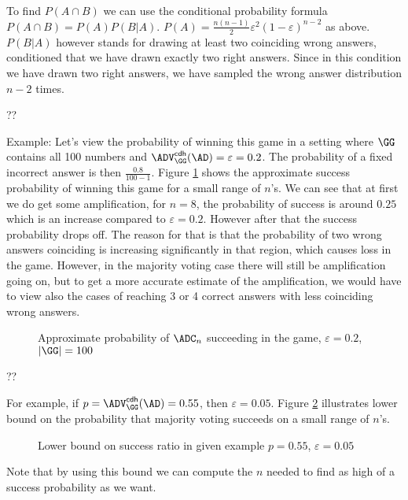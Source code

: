 \documentclass{crypto-exercise}
\begin{document}
\begin{solution}
\begin{center}
\end{center}

To find $P(A \cap B)$ we can use the conditional probability formula $P(A \cap B) = P(A)P(B|A)$. $P(A) = \frac{n(n-1)}{2} \varepsilon^2 (1-\varepsilon)^{n-2}$ as above. $P(B|A)$ however stands for drawing at least two coinciding wrong answers, conditioned that we have drawn exactly two right answers. Since in this condition we have drawn two right answers, we have sampled the wrong answer distribution $n-2$ times. 

??


Example: Let's view the probability of winning this game in a setting where $\GG$ contains all 100 numbers and $\ADVCDH{\GG}{\AD} = \varepsilon = 0.2$. The probability of a fixed incorrect answer is then $\frac{0.8}{100-1}$. Figure \ref{approx} shows the approximate success probability of winning this game for a small range of $n$'s. We can see that at first we do get some amplification, for $n=8$, the probability of success is around $0.25$ which is an increase compared to $\varepsilon = 0.2$. However after that the success probability drops off. The reason for that is that the probability of two wrong answers coinciding is increasing significantly in that region, which causes loss in the game. However, in the majority voting case there will still be amplification going on, but to get a more accurate estimate of the amplification, we would have to view also the cases of reaching 3 or 4 correct answers with less coinciding wrong answers.

\begin{figure}[!htb]
\centering
\caption{Approximate probability of $\ADC_n$ succeeding in the game, $\varepsilon = 0.2$, $|\GG| = 100$}
\label{approx}
\end{figure}

??

For example, if $p = \ADVCDH{\GG}{\AD} = 0.55$, then $\varepsilon = 0.05$. Figure \ref{upperbound} illustrates lower bound on the probability that majority voting succeeds on a small range of $n$'s.
\begin{figure}[!htb]
\centering
\caption{Lower bound on success ratio in given example $p = 0.55$, $\varepsilon = 0.05$}
\label{upperbound}
\end{figure}
Note that by using this bound we can compute the $n$ needed to find as high of a success probability as we want.


\end{solution}
\end{document}
